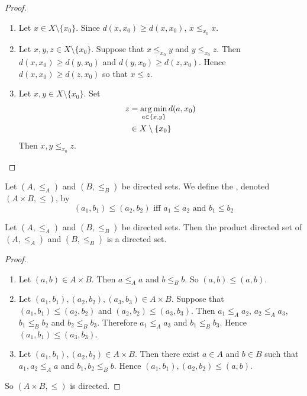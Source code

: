 \documentclass{book}
\begin{document}
	\begin{proof}\
		\begin{enumerate}
			\item Let $x \in X \setminus \{x_0\}$. Since $d(x, x_0) \geq d(x, x_0)$, $x \leq_{x_0} x$.
			\item Let $x, y, z \in X \setminus \{x_0\}$. Suppose that $x \leq_{x_0} y$ and $y \leq_{x_0} z$. Then $d(x, x_0) \geq d(y, x_0)$ and $d(y, x_0) \geq d(z, x_0)$. Hence $d(x, x_0) \geq d(z, x_0)$ so that $x \leq z$.
			\item Let $x,y \in X \setminus \{x_0\}$. Set 
			\begin{align*}
				z 
				&= \operatorname*{arg\,min}\limits_{a \in \{x, y\}} d(a, x_0) \\ 
				& \in X \setminus \{x_0\} 
			\end{align*}
			Then $x, y \leq_{x_0} z$.
		\end{enumerate}
	\end{proof}

	\begin{defn}
		Let $(A, \leq_A)$ and $(B, \leq_B)$ be directed sets. We define the , denoted $(A \times B, \leq)$, by 
		$$(a_1, b_1) \leq (a_2, b_2) \text{ iff } a_1 \leq a_2 \text{ and } b_1 \leq b_2$$
	\end{defn}

	\begin{ex}
		Let $(A, \leq_A)$ and $(B, \leq_B)$ be directed sets. Then the product directed set of $(A, \leq_A)$ and $(B, \leq_B)$ is a directed set.
	\end{ex}

	\begin{proof}\
		\begin{enumerate}
			\item Let $(a, b) \in A \times B$. Then $a \leq_A a$ and $b \leq_B b$. So $(a, b) \leq (a ,b)$.
			\item Let $(a_1, b_1), (a_2, b_2), (a_3, b_3) \in A \times B$. Suppose that $(a_1, b_1) \leq (a_2, b_2)$ and $(a_2, b_2) \leq (a_3, b_3)$. Then $a_1 \leq_A a_2$, $a_2 \leq_A a_3$, $b_1 \leq_B b_2$ and $b_2 \leq_B b_3$. Therefore $a_1 \leq_A a_3$ and $b_1 \leq_B b_3$. Hence $(a_1, b_1) \leq (a_3, b_3)$.
			\item Let $(a_1, b_1), (a_2, b_2) \in A \times B$. Then there exist $a \in A$ and $b \in B$ such that $a_1, a_2 \leq_A a$ and $b_1, b_2 \leq_B b$. Hence $(a_1, b_1), (a_2, b_2) \leq (a, b)$.
		\end{enumerate}
		So $(A \times B, \leq)$ is directed.
	\end{proof}
	
\end{document}
